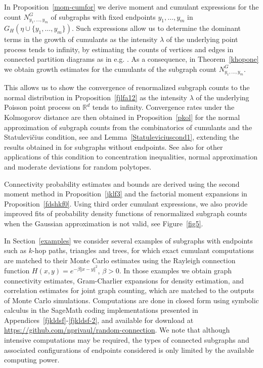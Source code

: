 \documentclass[12pt]{article}
\newcommand{\R}{\mathbb{R}}
\numberwithin{equation}{section}
\begin{document}
 \medskip 

In Proposition~\ref{mom-cumfor} we derive
moment and cumulant expressions
for the count $N^G_{y_1,\ldots , y_m}$ of subgraphs with fixed endpoints
$y_1, \ldots ,y_m$ in $G_H (\eta\cup \{y_1, \ldots ,y_m\})$.
Such expressions allow us to determine the dominant terms in the growth of
 cumulants as the intensity $\lambda$ of the underlying point process tends to infinity, 
 by estimating the counts of vertices and edges in connected
 partition diagrams as in e.g. \cite{khorunzhiy}. 
 As a consequence, in Theorem~\ref{khopone}
 we obtain growth estimates for the cumulants of
 the subgraph count $N^G_{y_1,\ldots , y_m}$. 

 \medskip

 This allows us to show the convergence of renormalized subgraph
 counts to the normal distribution in Proposition~\ref{fjlfa12}
 as the intensity $\lambda$ of the underlying Poisson point process on $\R^d$
 tends to infinity.
Convergence rates under the Kolmogorov distance
are then obtained in Proposition~\ref{pkol}
for the normal approximation of subgraph counts
from the combinatorics of cumulants
 and the {Statulevi\v{c}ius condition}, see \cite{rudzkis,doering}
 and Lemma~\ref{Statuleviciuscond1}, 
 extending the results obtained in \cite{LiuPrivault}
 for subgraphs without endpoints.
 See also \cite{thale18} %
 for other applications of this condition
 to concentration inequalities,
 normal approximation and moderate deviations for random polytopes.

 \medskip
  
 Connectivity probability
 estimates and bounds are derived using the second moment
 method in Proposition~\ref{jklf3}  
 and the factorial moment expansions in Proposition~\ref{fdshkf0}. 
 Using third order cumulant expressions, we also provide
 improved fits of probability density functions of renormalized
 subgraph counts when the Gaussian approximation is not valid,
 see Figure~\ref{fig5}. 
 
\medskip 

In Section~\ref{examples} we consider several examples of
subgraphs with endpoints such as $k$-hop paths,
triangles and trees, for which  
exact cumulant computations are matched to their
Monte Carlo estimates 
 using the Rayleigh connection function $H(x,y) = e^{ - \beta \Vert x - y\Vert^2}$, 
 $\beta > 0$.
 In those examples
 we obtain graph connectivity estimates,
 Gram-Charlier expansions for density estimation,
 and correlation estimates for joint graph counting,
 which are matched to the outputs of Monte Carlo simulations. 
 Computations are done in closed form using symbolic calculus 
 in the SageMath coding implementations 
 presented in Appendices~\ref{fjkldsf}-\ref{fjkldsf-2}, 
 and available for download at 
 \url{https://github.com/nprivaul/random-connection}.  
 We note that although intensive computations may be required,
the types of connected subgraphs and associated configurations 
of endpoints considered is only limited by the available computing
power. 
\end{document}
